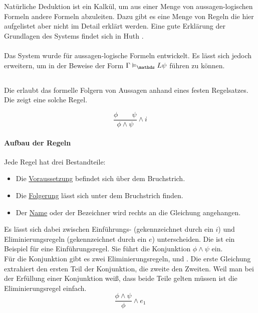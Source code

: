 
\section{\ND} %
\label{sub:natuerliche_folgerung}
Natürliche Deduktion ist ein Kalkül, um aus einer Menge von aussagen-logischen Formeln andere Formeln abzuleiten.
Dazu gibt es eine Menge von Regeln die hier aufgelistet aber nicht im Detail erklärt werden.
Eine gute Erklärung der Grundlagen des Systems findet sich in Huth \cite[Kapitel 1.2 (natural deduction)]{huth2004logic}.\\
\\
Das System wurde für aussagen-logische Formeln entwickelt. Es lässt sich jedoch erweitern, um in der \ML Beweise der Form $\Gamma \vDash_\Menge{L} \psi$ führen zu können.\\

\subsection{\ND \AL} %
\label{par:natuerliche_deduktion_aussagenlogick}
Die \ND erlaubt das formelle Folgern von Aussagen anhand eines festen Regelsatzes.
Die  zeigt eine solche Regel.

\begin{equation}
	\label{eq:iConjunction}
	\frac{\phi \qquad \psi}{\phi \wedge \psi} \wedge i
\end{equation}	

\paragraph{Aufbau der Regeln}

Jede Regel hat drei Bestandteile:
\begin{itemize}
	\item Die \underline{Voraussetzung} befindet sich über dem Bruchstrich.
	\item Die \underline{Folgerung} lässt sich unter dem Bruchstrich finden.
	\item Der \underline{Name} oder der Bezeichner wird rechts an die Gleichung angehangen.
\end{itemize}
Es lässt sich dabei zwischen Einführungs- (gekennzeichnet durch ein $i$) und Eliminierungsregeln (gekennzeichnet durch ein $e$) unterscheiden.
Die  ist ein Beispiel für eine Einführungsregel.
Sie führt die Konjunktion $\phi \wedge \psi$ ein.\\
Für die Konjunktion gibt es zwei Eliminierungsregeln,  und .
Die erste Gleichung extrahiert den ersten Teil der Konjunktion, die zweite den Zweiten.
Weil man bei der Erfüllung einer Konjunktion weiß, dass beide Teile gelten müssen ist die Eliminierungsregel einfach.\\
%
\begin{equation}
	\label{eq:e1Conjunction}
	\frac{\phi \wedge \psi}{\phi} \wedge e_1
\end{equation}


